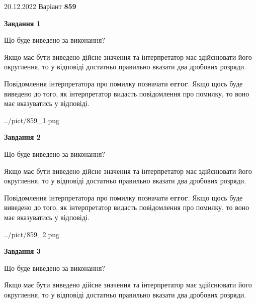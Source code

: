\documentclass[12pt, ukrainian]{article}
\begin{document}
{20.12.2022 Варіант \No \textbf { 859 }\par}
{
\begin {Large}

{\begin {center}\textbf{Завдання 1}\end {center}}\par
Що буде виведено за виконання? \par

Якщо має бути виведено дійсне значення та інтерпретатор має здійснювати його округлення, 
то у відповіді достатньо правильно вказати два дробових розряди.

Повідомлення інтерпретатора про помилку позначати \textbf{error}.
Якщо щось буде виведено до того, як інтерпретатор видасть повідомлення про помилку, 
то воно має вказуватись у відповіді. \par

\begin{center}
	{../pict/859_1.png}
\end{center}
\newpage

{\begin {center}\textbf{Завдання 2}\end {center}}\par
Що буде виведено за виконання? \par

Якщо має бути виведено дійсне значення та інтерпретатор має здійснювати його округлення, 
то у відповіді достатньо правильно вказати два дробових розряди.

Повідомлення інтерпретатора про помилку позначати \textbf{error}.
Якщо щось буде виведено до того, як інтерпретатор видасть повідомлення про помилку, 
то воно має вказуватись у відповіді. \par

\begin{center}
	{../pict/859_2.png}
\end{center}
\newpage

{\begin {center}\textbf{Завдання 3}\end {center}}\par
Що буде виведено за виконання? \par

Якщо має бути виведено дійсне значення та інтерпретатор має здійснювати його округлення, 
то у відповіді достатньо правильно вказати два дробових розряди.


\end{Large}}
\end{document}
